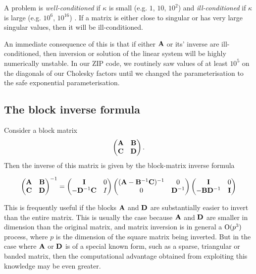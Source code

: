 \documentclass{amsart}[12pt]
\begin{document}

A problem is \emph{well-conditioned} if $\kappa$ is small (e.g. $1$, $10$, $10^2$) and \emph{ill-conditioned}
if $\kappa$ is large (e.g. $10^6$, $10^{16}$) \cite{trefethen97}.  If a matrix is either close to singular or
has very large singular values, then it will be ill-conditioned.

An immediate consequence of this is that if either ${\bf A}$ or its' inverse are ill-conditioned, then inversion
or solution of the linear system will be highly numerically unstable. In our ZIP code, we routinely saw values of 
at least $10^5$ on the diagonals of our Cholesky factors until we changed the parameterisation to the safe
exponential parameterisation.

\subsection{The block inverse formula}

Consider a block matrix
\[
	\begin{pmatrix}
		{\bf A} & {\bf B} \\
		{\bf C} & {\bf D} 
	\end{pmatrix}.
\]
Then the inverse of this matrix is given by the block-matrix inverse formula

\[
	\begin{pmatrix}
		{\bf A} & {\bf B} \\
		{\bf C} & {\bf D} 
	\end{pmatrix}^{-1}
	=
	\begin{pmatrix}
		{\bf I}           & 0 \\
		-{\bf D}^{-1} {\bf C} & I 
	\end{pmatrix}
	\begin{pmatrix}
		({\bf A} - {\bf B}^{-1}{\bf C})^{-1} & 0        \\
		0                        & {\bf D}^{-1} 
	\end{pmatrix}
	\begin{pmatrix}
		{\bf I}          & 0   \\
		-{\bf B}{\bf D}^{-1} & {\bf I} 
	\end{pmatrix}
\]

This is frequently useful if the blocks ${\bf A}$ and ${\bf D}$ are substantially easier to invert than the entire
matrix. This is usually the case because ${\bf A}$ and ${\bf D}$ are smaller in dimension than the original matrix,
and matrix inversion is in general a $\text{O}(p^3)$ process, where $p$ is the dimension of the square matrix
being inverted. But in the case where ${\bf A}$ or ${\bf D}$ is of a special known form, such as a sparse, triangular
or banded matrix, then the computational advantage obtained from exploiting this knowledge may be even
greater.
\end{document}
